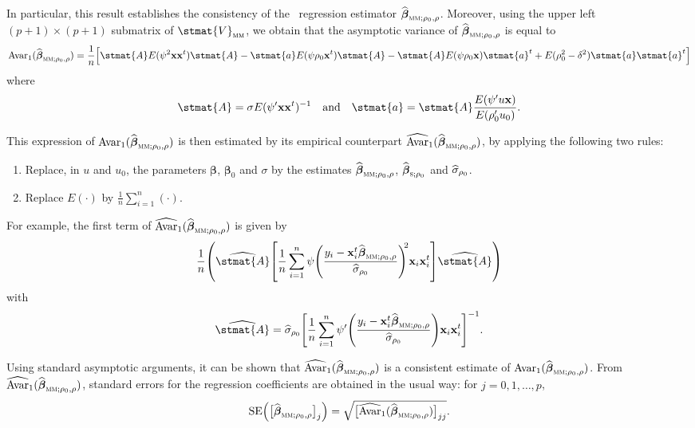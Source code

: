 In particular, this result establishes the consistency of the ~regression
estimator $\sthat{\boldsymbol\beta}_{\stsc{MM};\rho_0,\rho}$.
Moreover, using the upper left $(p+1) \times (p+1)$ submatrix of
$\stmat{V}_\stsc{MM}$, we obtain that the asymptotic variance of
$\sthat{\boldsymbol\beta}_{\stsc{MM};\rho_0,\rho}$ is equal to
%
\[
    \mathrm{Avar}_1 (\sthat{\boldsymbol\beta}_{\stsc{MM};\rho_0,\rho})
        = \frac{1}{n} \left[\stmat{A} E(\psi^2\stvec{x}\stvec{x}^t) \stmat{A}
        - \stmat{a} E(\psi\rho_0\stvec{x}^t) \stmat{A} 
        - \stmat{A} E(\psi\rho_0\stvec{x}) \stmat{a}^t
        + E(\rho_0^2-\delta^2) \stmat{a}\stmat{a}^t \right]
\]
%
where
\[
    \stmat{A} = \sigma E(\psi'\stvec{x}\stvec{x}^t)^{-1}
    \quad\text{and}\quad
    \stmat{a} = \stmat{A}\frac{E(\psi'u\stvec{x})}{E(\rho_0'u_0)}.
\]

This expression of
$\mathrm{Avar}_1(\sthat{\boldsymbol\beta}_{\stsc{MM};\rho_0,\rho})$ is then
estimated by its empirical counterpart
$\sthat{\mathrm{Avar}}_1(\sthat{\boldsymbol\beta}_{\stsc{MM};\rho_0,\rho})$, by
applying the following two rules:
\begin{enumerate}
    \item Replace, in $u$ and $u_0$, the parameters $\boldsymbol\beta$,
    $\boldsymbol\beta_0$ and $\sigma$ by the estimates 
    $\sthat{\boldsymbol\beta}_{\stsc{MM};\rho_0,\rho}$, 
    $\sthat{\boldsymbol\beta}_{\stsc{S};\rho_0}$ and $\widehat{\sigma}_{\rho_0}$.

    \item Replace $E(\cdot)$ by $\frac{1}{n}\sum_{i=1}^{n}(\cdot)$.
\end{enumerate}

For example, the first term of
$\sthat{\mathrm{Avar}}_1(\sthat{\boldsymbol\beta}_{\stsc{MM};\rho_0,\rho})$ is
given by
\[
    \frac{1}{n} \left(\sthat{\stmat{A}}\left[
        \frac{1}{n}\sum_{i=1}^{n}\psi\left(
            \frac{y_i-\stvec{x}_i^t\sthat{\boldsymbol\beta}_{\stsc{MM};\rho_0,\rho}}
            {\sthat{\sigma}_{\rho_0}}
            \right)^{\!\!2} \stvec{x}_i\stvec{x}_i^t
    \right] \sthat{\stmat{A}}\right)
\]
with
\[
    \sthat{\stmat{A}} = \sthat{\sigma}_{\rho_0}\left[
        \frac{1}{n}\sum_{i=1}^{n}\psi'\left(
            \frac{y_i-\stvec{x}_i^t\sthat{\boldsymbol\beta}_{\stsc{MM};\rho_0,\rho}}
            {\sthat{\sigma}_{\rho_0}}
    \right) \stvec{x}_i\stvec{x}_i^t\right]^{-1}.
\]

Using standard asymptotic arguments, it can be shown that
$\sthat{\mathrm{Avar}}_1(\sthat{\boldsymbol\beta}_{\stsc{MM};\rho_0,\rho})$ is
a consistent estimate of
$\mathrm{Avar}_1(\sthat{\boldsymbol\beta}_{\stsc{MM};\rho_0,\rho})$. From
$\sthat{\mathrm{Avar}}_1(\sthat{\boldsymbol\beta}_{\stsc{MM};\rho_0,\rho})$,
standard errors for the regression coefficients are obtained in the usual way:
for $j = 0, 1, \dots, p$,
\[
    \mathrm{SE}\left(\big[\sthat{\boldsymbol\beta}_{\stsc{MM};\rho_0,\rho}\big]_j\right) 
    = \sqrt{\big[\sthat{\mathrm{Avar}}_1(\sthat{\boldsymbol\beta}_{\stsc{MM};\rho_0,\rho})\big]_{jj}}.
\]


